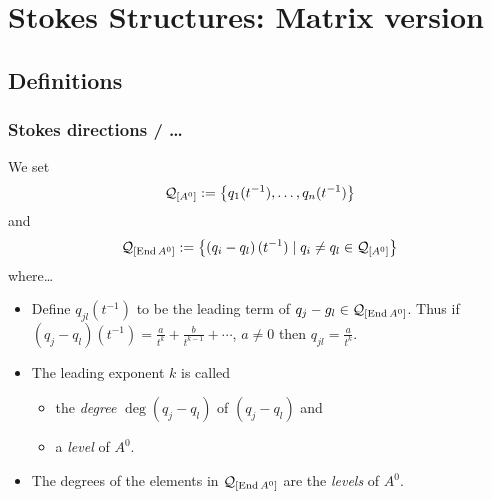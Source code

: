 \section{Stokes Structures: Matrix version}
\begin{comment}
  See
  \begin{itemize}
    \item \cite{Loday1994}
    \item \cite{boalch} and \cite{thboalch}
    \item \cite{babbitt1989local}
  \end{itemize}
\end{comment}

\subsection{Definitions}
\subsubsection{Stokes directions / \dots}
\begin{comment}
  \cite{Loday1994} \$I.4
\end{comment}
We set
\[
  \mathcal{Q}_{[A^0]}:=\left\{q_1(t^{-1}),\dots,q_n(t^{-1})\right\}
\]
and
\[
  \mathcal{Q}_{[\operatorname{End} A^0]}:=\left\{\left(q_i-q_l\right)(t^{-1})
    \mid q_i \neq q_l \in\mathcal{Q}_{[A^0]}
  \right\}
\]
where\dots
\begin{defn}
  \begin{itemize}
    \item Define $q_{jl}(t^{-1})$ to be the leading term of
      $q_j-g_l\in\mathcal{Q}_{[\operatorname{End} A^0]}$.  Thus if
      $(q_j-q_l)(t^{-1})=\frac{a}{t^k}+\frac{b}{t^{k-1}}+\cdots$, $a\neq0$ then
      $q_{jl}=\frac{a}{t^k}$.
      \begin{comment}
        Thus if $(q_j-q_l)(t^{-1})=\frac{a}{t^k}+h$ with $h\in o(t^{-k})$ then
        $q_{jl}=\frac{a}{t^k}$.
      \end{comment}
    \item The leading exponent $k$ is called
      \begin{itemize}
        \item the \emph{degree} $\deg(q_j-q_l)$ of $(q_j-q_l)$ and
        \item a \emph{level} of $A^0$.
      \end{itemize}
    \item The degrees of the elements in $\mathcal{Q}_{[\operatorname{End} A^0]}$ are the
      \emph{levels} of $A^0$.
      \begin{comment}
        \begin{rem}
          Levels are rational numbers. The unramified case is the case when
          all levels are integers.
          \TODO[Maby use definitions from \cite{Loday1994} p.857 in case of
            ramification]
        \end{rem}
      \end{comment}
  \end{itemize}
\end{defn}

